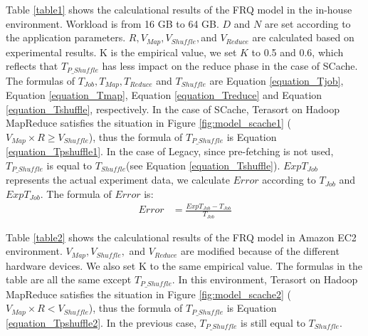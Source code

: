 {Table \ref{table1} shows the calculational results of the FRQ model in the in-house environment. Workload is from 16 GB to 64 GB. \(D\) and \(N\) are set according to the application parameters. \(R, V_{Map}, V_{Shuffle},\)and \(V_{Reduce}\) are calculated based on experimental results. K is the empirical value, we set \(K\) to 0.5 and 0.6, which reflects that \(T_{P\_Shuffle}\) has less impact on the reduce phase in the case of SCache. The formulas of \(T_{Job}, T_{Map}, T_{Reduce}\) and \(T_{Shuffle}\) are Equation \ref{equation_Tjob}, Equation \ref{equation_Tmap}, Equation \ref{equation_Treduce} and Equation \ref{equation_Tshuffle}, respectively. In the case of SCache, Terasort on Hadoop MapReduce satisfies the situation in Figure \ref{fig:model_scache1} (\(V_{Map} \times R \ge V_{Shuffle}\)), thus the formula of \(T_{P\_Shuffle}\) is Equation \ref{equation_Tpshuffle1}. In the case of Legacy, since pre-fetching is not used, \(T_{P\_Shuffle}\) is equal to \(T_{Shuffle}\)(see Equation \ref{equation_Tshuffle}). \(ExpT_{Job}\) represents the actual experiment data, we calculate \(Error\) according to \(T_{Job}\) and \(ExpT_{Job}\). The formula of \(Error\) is:
\begin{equation}
	\label{equation_error}
	\begin{aligned}
		Error &= \frac{ExpT_{Job} - T_{Job}}{T_{Job}}
	\end{aligned}
\end{equation}

Table \ref{table2} shows the calculational results of the FRQ model in Amazon EC2 environment. \(V_{Map}, V_{Shuffle},\) and \(V_{Reduce}\) are modified because of the different hardware devices. We also set K to the same empirical value. The formulas in the table are all the same except \(T_{P\_Shuffle}\). In this environment, Terasort on Hadoop MapReduce satisfies the situation in Figure \ref{fig:model_scache2} (\(V_{Map} \times R < V_{Shuffle}\)), thus the formula of \(T_{P\_Shuffle}\) is Equation \ref{equation_Tpshuffle2}. In the previous case, \(T_{P\_Shuffle}\) is still equal to \(T_{Shuffle}\).

}
